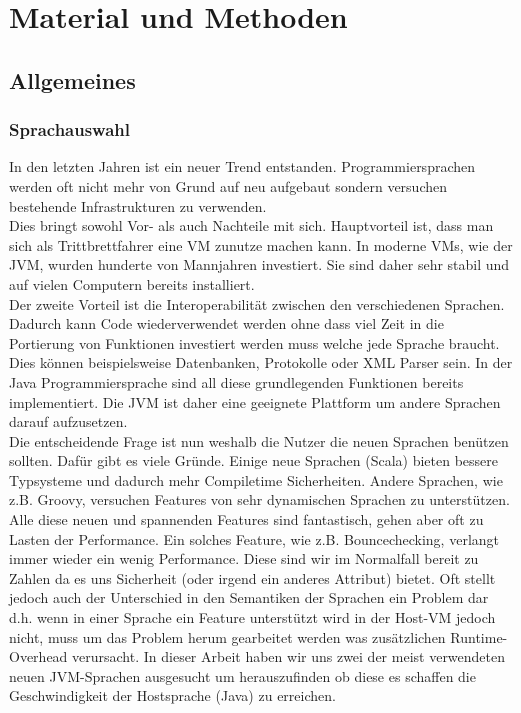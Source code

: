 \documentclass{fancydocument}
\begin{document}
\section{Material und Methoden}

\subsection{Allgemeines}

\subsubsection{Sprachauswahl}

In den letzten Jahren ist ein neuer Trend
entstanden. Programmiersprachen werden oft nicht mehr von Grund auf neu
aufgebaut sondern versuchen bestehende Infrastrukturen zu verwenden.
\\
Dies bringt sowohl Vor- als auch Nachteile mit sich. Hauptvorteil ist, dass
man sich als Trittbrettfahrer eine VM zunutze machen kann. In moderne
VMs, wie der JVM, wurden hunderte von Mannjahren investiert. Sie sind
daher sehr stabil und auf vielen Computern bereits installiert.
\\
Der zweite Vorteil ist die Interoperabilität zwischen den
verschiedenen Sprachen. Dadurch kann Code
wiederverwendet werden ohne dass viel Zeit in die Portierung von
Funktionen investiert werden muss welche jede Sprache braucht. Dies können beispielsweise Datenbanken, Protokolle oder XML Parser sein. In der Java Programmiersprache sind all diese grundlegenden Funktionen
bereits implementiert. Die JVM ist daher eine geeignete Plattform um andere
Sprachen darauf aufzusetzen.
\\
Die entscheidende Frage ist nun weshalb die Nutzer die neuen
Sprachen ben\"utzen sollten. Dafür gibt es viele Gründe. Einige neue
Sprachen (Scala) bieten bessere Typsysteme und dadurch mehr
Compiletime Sicherheiten. Andere Sprachen, wie z.B. Groovy, versuchen Features
von sehr dynamischen Sprachen zu unterst\"utzen.
\\
Alle diese neuen und spannenden Features sind fantastisch, gehen aber
oft zu Lasten der Performance. Ein solches Feature, wie z.B.
Bouncechecking, verlangt immer wieder ein wenig Performance. Diese
sind wir im Normalfall bereit zu Zahlen da es uns Sicherheit (oder
irgend ein anderes Attribut) bietet. Oft stellt jedoch auch
der Unterschied in den Semantiken der Sprachen ein Problem
dar d.h. wenn in einer Sprache ein Feature unterst\"utzt wird in der
Host-VM jedoch nicht, muss um das Problem herum gearbeitet werden was
zus\"atzlichen Runtime-Overhead verursacht. In dieser Arbeit haben wir
uns zwei der meist verwendeten neuen JVM-Sprachen ausgesucht um
herauszufinden ob diese es schaffen die Geschwindigkeit der
Hostsprache (Java) zu erreichen.
\end{document}
